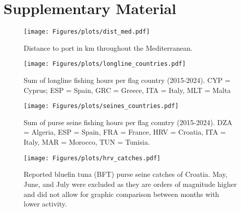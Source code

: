\chapter{Supplementary Material}

\begin{figure}[H]
	\centering
	\texttt{[image: Figures/plots/dist\_med.pdf]}
	\caption{Distance to port in km throughout the Mediterranean. }
	\label{fig:distance}
\end{figure}

\begin{figure}[H]
	\centering
	\texttt{[image: Figures/plots/longline\_countries.pdf]}
	\caption{Sum of longline fishing hours per flag country (2015-2024). CYP = Cyprus; ESP = Spain, GRC = Greece, ITA = Italy, MLT = Malta}
	\label{fig:longline_effort_countries}
\end{figure}

\begin{figure}[H]
	\centering
	\texttt{[image: Figures/plots/seines\_countries.pdf]}
	\caption{Sum of purse seine fishing hours per flag country (2015-2024). DZA = Algeria, ESP = Spain, FRA = France,
		HRV = Croatia, ITA = Italy, MAR = Morocco, TUN = Tunisia.}
	\label{fig:seine_effort_countries}
\end{figure}

\begin{figure}[H]
	\centering
	\texttt{[image: Figures/plots/hrv\_catches.pdf]}
	\caption{Reported bluefin tuna (BFT) purse seine catches of Croatia. May, June, and July were excluded as they are orders of magnitude higher and did not
		allow for graphic comparison between months with lower activity.}
	\label{fig:hrv}
\end{figure}



